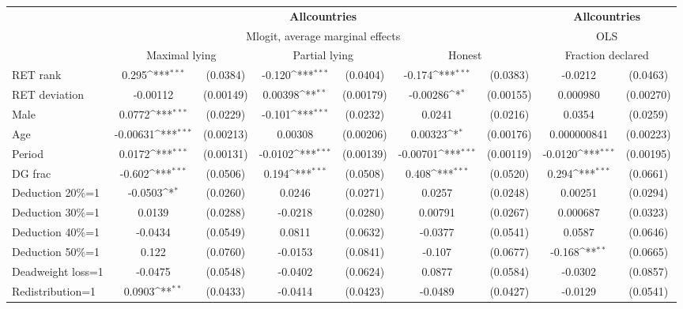 \def\sym#1{\ifmmode^{#1}\else\(^{#1}\)\fi}
\begin{tabular}{l|cccccc|cc}
\hline\hline
&\multicolumn{6}{c|}{\bf All\space{}countries}&\multicolumn{2}{c}{\bf All\space{}countries}\\ &\multicolumn{6}{c|}{Mlogit, average marginal effects }&\multicolumn{2}{c}{OLS}\\
                &\multicolumn{2}{c}{Maximal lying}&\multicolumn{2}{c}{Partial lying}&\multicolumn{2}{c}{Honest}  &\multicolumn{2}{c}{Fraction declared}\\
\hline
RET rank        &    0.295\sym{***}& (0.0384)&   -0.120\sym{***}& (0.0404)&   -0.174\sym{***}& (0.0383)&  -0.0212         & (0.0463)\\
RET deviation   & -0.00112         &(0.00149)&  0.00398\sym{**} &(0.00179)& -0.00286\sym{*}  &(0.00155)& 0.000980         &(0.00270)\\
Male            &   0.0772\sym{***}& (0.0229)&   -0.101\sym{***}& (0.0232)&   0.0241         & (0.0216)&   0.0354         & (0.0259)\\
Age             & -0.00631\sym{***}&(0.00213)&  0.00308         &(0.00206)&  0.00323\sym{*}  &(0.00176)&0.000000841         &(0.00223)\\
Period          &   0.0172\sym{***}&(0.00131)&  -0.0102\sym{***}&(0.00139)& -0.00701\sym{***}&(0.00119)&  -0.0120\sym{***}&(0.00195)\\
DG frac         &   -0.602\sym{***}& (0.0506)&    0.194\sym{***}& (0.0508)&    0.408\sym{***}& (0.0520)&    0.294\sym{***}& (0.0661)\\
Deduction 20\%=1&  -0.0503\sym{*}  & (0.0260)&   0.0246         & (0.0271)&   0.0257         & (0.0248)&  0.00251         & (0.0294)\\
Deduction 30\%=1&   0.0139         & (0.0288)&  -0.0218         & (0.0280)&  0.00791         & (0.0267)& 0.000687         & (0.0323)\\
Deduction 40\%=1&  -0.0434         & (0.0549)&   0.0811         & (0.0632)&  -0.0377         & (0.0541)&   0.0587         & (0.0646)\\
Deduction 50\%=1&    0.122         & (0.0760)&  -0.0153         & (0.0841)&   -0.107         & (0.0677)&   -0.168\sym{**} & (0.0665)\\
Deadweight loss=1&  -0.0475         & (0.0548)&  -0.0402         & (0.0624)&   0.0877         & (0.0584)&  -0.0302         & (0.0857)\\
Redistribution=1&   0.0903\sym{**} & (0.0433)&  -0.0414         & (0.0423)&  -0.0489         & (0.0427)&  -0.0129         & (0.0541)\\

\end{tabular}
